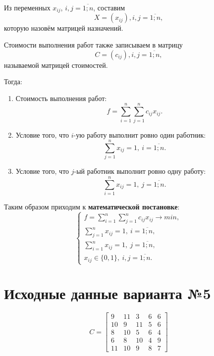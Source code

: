 \documentclass[a4paper,12pt, unknownkeysallowed]{extreport}
\begin{document}
Из переменных $x_{ij}$, $i,j = \overline{1; n}$, составим 
\begin{equation}
	X = (x_{ij}){, i,j = \overline{1; n}},
\end{equation}
которую назовём матрицей назначений.

Стоимости выполнения работ также записываем в матрицу
\begin{equation}
	C = (c_{ij}), {i,j = \overline{1; n}},
\end{equation}
называемой матрицей стоимостей.

Тогда:
\begin{enumerate}
	\item Стоимость выполнения работ:
	\begin{equation}
		f = \sum_{i=1}^n \sum_{j=1}^n c_{ij} x_{ij}.
	\end{equation}
	\item Условие того, что $i$-ую работу выполнит ровно один работник:
	\begin{equation}
		\sum_{j=1}^n x_{ij} = 1, \: i = \overline{1; n}.
	\end{equation}
	\item Условие того, что $j$-ый работник выполнит ровно одну работу:
	\begin{equation}
		\sum_{i=1}^n x_{ij} = 1, \: j = \overline{1; n}.
	\end{equation}
\end{enumerate}

Таким образом приходим к \textbf{математической постановке}:
\begin{equation}
	\begin{cases}
		f = \sum_{i=1}^n \sum_{j=1}^n c_{ij} x_{ij} \rightarrow min, \\
		\sum_{j=1}^n x_{ij} = 1, \: i = \overline{1; n}, \\
		\sum_{i=1}^n x_{ij} = 1, \: j = \overline{1; n}, \\
		x_{ij} \in \{0, 1\}, \: i,j = \overline{1; n}.
	\end{cases}
\end{equation}

\section{Исходные данные варианта №5}

\begin{equation}
	C = 
	\begin{bmatrix}
    9   &11&    3&    6&    6\\
	10   &9&   11&    5&    6\\
	8   &10&    5&    6&    4\\
	6    &8&   10&    4&    9\\
	11  &10&    9&    8&    7
	\end{bmatrix}
\end{equation}
\end{document}
